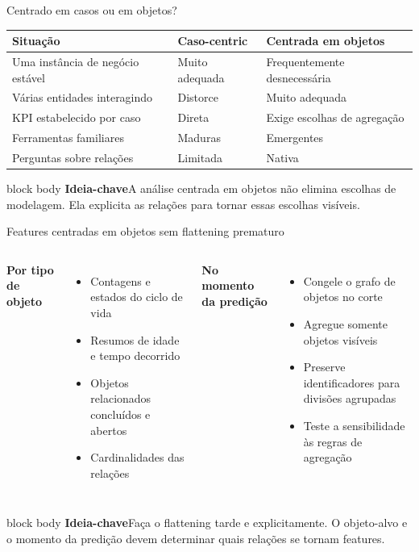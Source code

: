 \documentclass[aspectratio=169,11pt]{beamer}
\newcommand{\keyidea}[1]{%
  \begin{beamercolorbox}[rounded=true,sep=0.65em]{block body}
    \textbf{\color{Teal}Ideia-chave}\quad #1
  \end{beamercolorbox}
}
\begin{document}
\begin{frame}{Centrado em casos ou em objetos?}
  \small
  \begin{tabular}{@{}p{}p{}p{}@{}}
    \toprule
    Situação & Caso-centric & Centrada em objetos\\
    \midrule
    Uma instância de negócio estável & Muito adequada & Frequentemente desnecessária\\
    Várias entidades interagindo & Distorce & Muito adequada\\
    KPI estabelecido por caso & Direta & Exige escolhas de agregação\\
    Ferramentas familiares & Maduras & Emergentes\\
    Perguntas sobre relações & Limitada & Nativa\\
    \bottomrule
  \end{tabular}
  \vspace{0.5cm}
  \keyidea{A análise centrada em objetos não elimina escolhas de modelagem. Ela explicita as relações para tornar essas escolhas visíveis.}
\end{frame}

\begin{frame}{Features centradas em objetos sem flattening prematuro}
  \begin{columns}[T,onlytextwidth]
      \textbf{Por tipo de objeto}
      \begin{itemize}
        \item Contagens e estados do ciclo de vida
        \item Resumos de idade e tempo decorrido
        \item Objetos relacionados concluídos e abertos
        \item Cardinalidades das relações
      \end{itemize}
      \textbf{No momento da predição}
      \begin{itemize}
        \item Congele o grafo de objetos no corte
        \item Agregue somente objetos visíveis
        \item Preserve identificadores para divisões agrupadas
        \item Teste a sensibilidade às regras de agregação
      \end{itemize}
  \end{columns}
  \vspace{0.45cm}
  \keyidea{Faça o flattening tarde e explicitamente. O objeto-alvo e o momento da predição devem determinar quais relações se tornam features.}
\end{frame}
\end{document}
